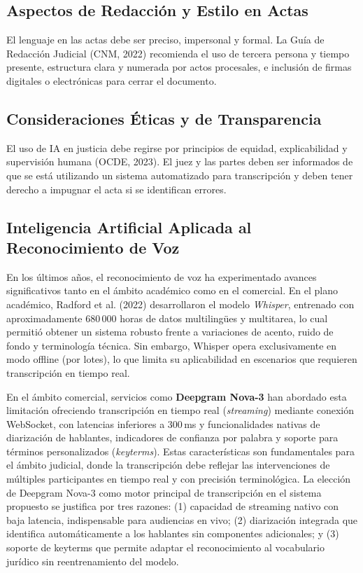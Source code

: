 \documentclass[12pt,a4paper,oneside]{report}
\begin{document}
\subsection{Aspectos de Redacción y Estilo en Actas}

El lenguaje en las actas debe ser preciso, impersonal y formal. La Guía de Redacción Judicial (CNM, 2022) recomienda el uso de tercera persona y tiempo presente, estructura clara y numerada por actos procesales, e inclusión de firmas digitales o electrónicas para cerrar el documento.

\subsection{Consideraciones Éticas y de Transparencia}

El uso de IA en justicia debe regirse por principios de equidad, explicabilidad y supervisión humana (OCDE, 2023). El juez y las partes deben ser informados de que se está utilizando un sistema automatizado para transcripción y deben tener derecho a impugnar el acta si se identifican errores.

\subsection{Inteligencia Artificial Aplicada al Reconocimiento de Voz}

En los últimos años, el reconocimiento de voz ha experimentado avances significativos tanto en el ámbito académico como en el comercial. En el plano académico, Radford et al. (2022) desarrollaron el modelo \textit{Whisper}, entrenado con aproximadamente 680\,000 horas de datos multilingües y multitarea, lo cual permitió obtener un sistema robusto frente a variaciones de acento, ruido de fondo y terminología técnica. Sin embargo, Whisper opera exclusivamente en modo offline (por lotes), lo que limita su aplicabilidad en escenarios que requieren transcripción en tiempo real.

En el ámbito comercial, servicios como \textbf{Deepgram Nova-3} han abordado esta limitación ofreciendo transcripción en tiempo real (\textit{streaming}) mediante conexión WebSocket, con latencias inferiores a 300\,ms y funcionalidades nativas de diarización de hablantes, indicadores de confianza por palabra y soporte para términos personalizados (\textit{keyterms}). Estas características son fundamentales para el ámbito judicial, donde la transcripción debe reflejar las intervenciones de múltiples participantes en tiempo real y con precisión terminológica. La elección de Deepgram Nova-3 como motor principal de transcripción en el sistema propuesto se justifica por tres razones: (1) capacidad de streaming nativo con baja latencia, indispensable para audiencias en vivo; (2) diarización integrada que identifica automáticamente a los hablantes sin componentes adicionales; y (3) soporte de keyterms que permite adaptar el reconocimiento al vocabulario jurídico sin reentrenamiento del modelo.
\end{document}
